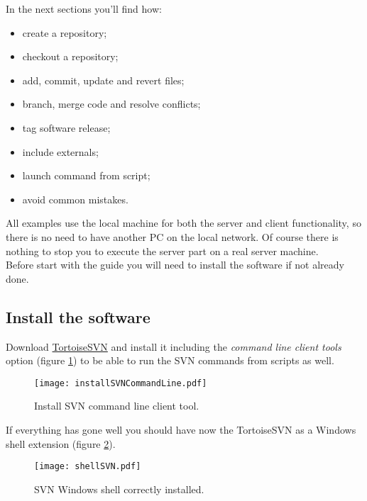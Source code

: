 In the next sections you'll find how:

\begin{itemize}
    \item create a repository;
    \item checkout a repository;
    \item add, commit, update and revert files;
    \item branch, merge code and resolve conflicts;
    \item tag software release;
    \item include externals;
    \item launch command from script;
    \item avoid common mistakes.
\end{itemize}

All examples use the local machine for both the server and client functionality, so there is no need to have another PC on the local network. Of course there is nothing to stop you to execute the server part on a real server machine.\\

Before start with the guide you will need to install the software if not already done.

\subsection{Install the software}
\label{subsection:InstallSoftware}

Download \href{https://tortoisesvn.net/downloads.html}{TortoiseSVN} and install it including the \textit{command line client tools} option (figure \ref{fig:installSVNCmd}) to be able to run the SVN commands from scripts as well.

\begin{figure}[htbp]
    \centering
    \texttt{[image: installSVNCommandLine.pdf]}
    \caption{Install SVN command line client tool.}
    \label{fig:installSVNCmd}
\end{figure}

If everything has gone well you should have now the TortoiseSVN as a Windows shell extension (figure \ref{fig:shellSVN}).

\begin{figure}[htbp]
    \centering
    \texttt{[image: shellSVN.pdf]}
    \caption{SVN Windows shell correctly installed.}
    \label{fig:shellSVN}
\end{figure}



